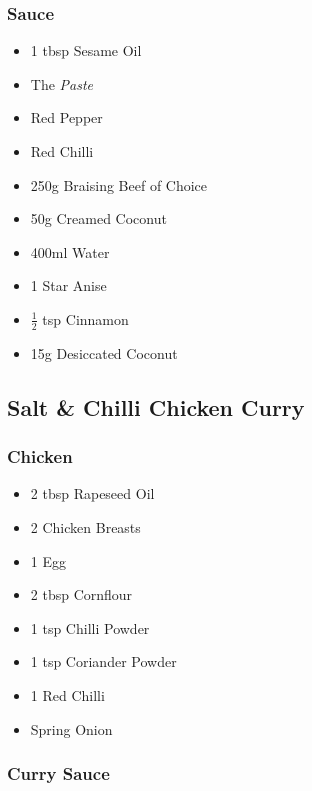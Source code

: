 \documentclass[11pt, english]{article}
\begin{document}
		\subsubsection*{Sauce}

	\begin{itemize}
        \setlength\itemsep{0cm}
                \item 1 tbsp Sesame Oil
                \item The \textit{Paste}
                \item Red Pepper
		\item Red Chilli
		\item 250g Braising Beef of Choice
                \item 50g Creamed Coconut
		\item 400ml Water
		\item 1 Star Anise
		\item $\frac{1}{2}$ tsp Cinnamon
		\item 15g Desiccated Coconut
        \end{itemize}

\newpage

	\subsection{Salt \& Chilli Chicken Curry}

		\subsubsection*{Chicken}

	\begin{itemize}
        \setlength\itemsep{0cm}
                \item 2 tbsp Rapeseed Oil
		\item 2 Chicken Breasts
		\item 1 Egg
		\item 2 tbsp Cornflour
		\item 1 tsp Chilli Powder
		\item 1 tsp Coriander Powder
		\item 1 Red Chilli
		\item Spring Onion
        \end{itemize}

		\subsubsection*{Curry Sauce}
\end{document}
